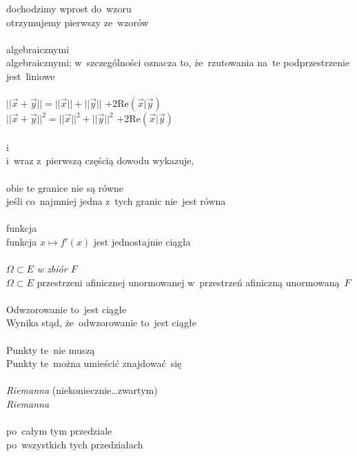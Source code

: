 \documentclass[a4paper,11pt]{article}
\begin{document}
\Jest dochodzimy wprost do~wzoru \\
\Pow  otrzymujemy pierwszy ze~wzorów \\
 \\
\Jest algebraicznymi \\
\Pow  algebraicznymi; w~szczególności oznacza to, że~rzutowania na~te podprzestrzenie jest~liniowe \\
 \\
\Jest
$|| \vec{ x } + \vec{ y } || = || \vec{ x } || + || \vec{ y } ||$
$+ 2 \mathrm{Re}( \vec{ x } | \vec{ y } )$ \\
\Pow $|| \vec{ x } + \vec{ y } ||^{ 2 } = || \vec{ x } ||^{ 2 }
+ || \vec{ y } ||^{ 2 }$ $+ 2 \mathrm{Re}( \vec{ x } | \vec{ y } )$ \\
 \\
\Jest i \\
\Pow i~wraz z~pierwszą częścią dowodu wykazuje, \\
 \\
\Jest obie te granice nie są równe \\
\Pow  jeśli co~najmniej jedna z~tych granic nie~jest równa \\
 \\
\Jest funkcja \\
\Pow  funkcja $x \mapsto f'( x )$ jest jednostajnie ciągła \\
 \\
\Jest \emph{$\Omega \subset E$ w zbiór $F$} \\
\Pow  $\Omega \subset E$ przestrzeni afinicznej unormowanej w~przestrzeń afiniczną unormowaną~$F$ \\
 \\
\Jest Odwzorowanie to~jest ciągłe \\
\Pow  Wynika stąd, że~odwzorowanie to~jest ciągłe \\
 \\
\Jest Punkty te~nie muszą \\
\Pow  Punkty te~można umieścić znajdować~się \\
 \\
\Jest \emph{Riemanna} (niekoniecznie\ldots zwartym) \\
\Pow  \emph{Riemanna} \\
 \\
\Jest po~całym tym przedziale \\
\Pow  po~wszystkich tych przedziałach \\
\end{document}
